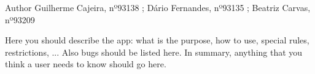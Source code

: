 \begin{DoxyAuthor}{Author}
Guilherme Cajeira, nº93138 ; Dário Fernandes, nº93135 ; Beatriz Carvas, nº93209
\end{DoxyAuthor}
Here you should describe the app\+: what is the purpose, how to use, special rules, restrictions, ... Also bugs should be listed here. In summary, anything that you think a user needs to know should go here. 